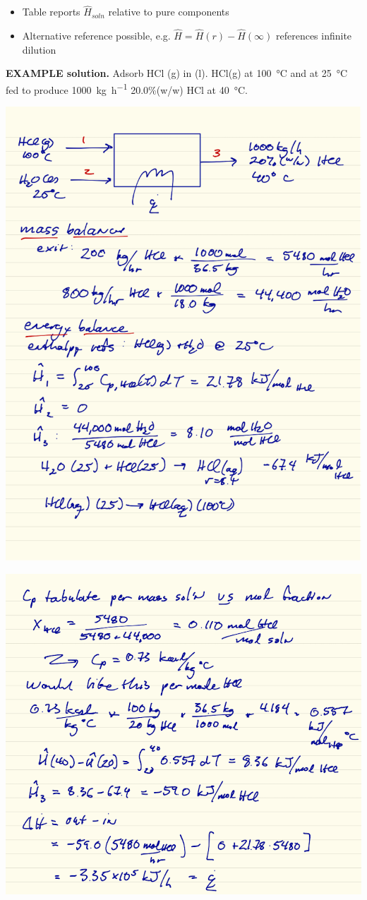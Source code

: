 \documentclass[11pt]{article}
\begin{document}
\begin{itemize}
\item Table reports \(\hat{H}_{soln}\) relative to pure components
\item Alternative reference possible, e.g. \(\hat{H} = \hat{H}(r) - \hat{H}(\infty)\) references infinite dilution
\end{itemize}

\begin{framed}
\noindent \textbf{EXAMPLE solution.}  Adsorb HCl (g) in  (l).  HCl(g) at \SI{100}{\celsius} and  at \SI{25}{\celsius} fed to produce \SI{1000}{\kilogram\per\hour} 20.0\%(w/w) HCl at \SI{40}{\celsius}.
\end{framed}

\includegraphics[width=.9\linewidth]{./figs/Mixture1.png}

\includegraphics[width=.9\linewidth]{./figs/Mixture2.png}
\end{document}

